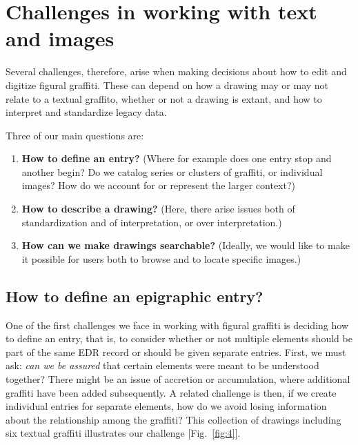 \documentclass[amsthm,ebook]{saparticle}
\begin{document}
\section{Challenges in working with text and images}


Several challenges, therefore, arise when making decisions about how to edit and digitize figural graffiti. These can
depend on how a drawing may or may not relate to a textual graffito, whether or not a drawing is extant, and how to
interpret and standardize legacy data. 




Three of our main questions are:

\begin{enumerate}
\item \textbf{How to define an entry?} (Where for example does one entry stop and another begin? Do we catalog series or clusters
of graffiti, or individual images? How do we account for or represent the larger context?)
\item \textbf{How to describe a drawing?} (Here, there arise issues both of standardization and of interpretation, or over
interpretation.)
\item \textbf{How can we make drawings searchable?} (Ideally, we would like to make it possible for users both to browse and to
locate specific images.)
\end{enumerate}



\subsection{How to define an epigraphic entry?}
 

One of the first challenges we face in working with figural graffiti is deciding how to define an entry, that is, to
consider whether or not multiple elements should be part of the same EDR record or should be given separate entries.
First, we must ask: \emph{can we be assured} that certain elements were meant to be understood together? There might be an
issue of accretion or accumulation, where additional graffiti have been added subsequently. A related challenge is
then, if we create individual entries for separate elements, how do we avoid losing information about the relationship
among the graffiti? This collection of drawings including six textual graffiti illustrates our challenge [Fig.~\ref{fig:4}].
\end{document}
